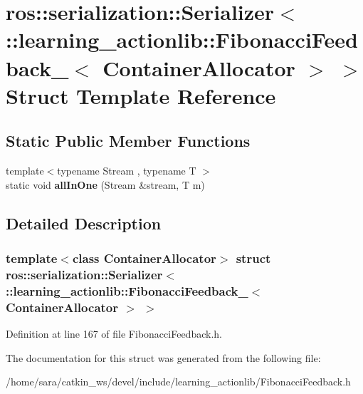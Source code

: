 \hypertarget{structros_1_1serialization_1_1Serializer_3_01_1_1learning__actionlib_1_1FibonacciFeedback___3_01ContainerAllocator_01_4_01_4}{}\section{ros\+:\+:serialization\+:\+:Serializer$<$ \+:\+:learning\+\_\+actionlib\+:\+:Fibonacci\+Feedback\+\_\+$<$ Container\+Allocator $>$ $>$ Struct Template Reference}
\label{structros_1_1serialization_1_1Serializer_3_01_1_1learning__actionlib_1_1FibonacciFeedback___3_01ContainerAllocator_01_4_01_4}
\subsection*{Static Public Member Functions}
\begin{DoxyCompactItemize}
\item 
\mbox{\label{structros_1_1serialization_1_1Serializer_3_01_1_1learning__actionlib_1_1FibonacciFeedback___3_01ContainerAllocator_01_4_01_4_a725d889a5c27625b116a7d0308266ded}} 
{\footnotesize template$<$typename Stream , typename T $>$ }\\static void {\bfseries all\+In\+One} (Stream \&stream, T m)
\end{DoxyCompactItemize}


\subsection{Detailed Description}
\subsubsection*{template$<$class Container\+Allocator$>$\newline
struct ros\+::serialization\+::\+Serializer$<$ \+::learning\+\_\+actionlib\+::\+Fibonacci\+Feedback\+\_\+$<$ Container\+Allocator $>$ $>$}



Definition at line 167 of file Fibonacci\+Feedback.\+h.



The documentation for this struct was generated from the following file\+:\begin{DoxyCompactItemize}
\item 
/home/sara/catkin\+\_\+ws/devel/include/learning\+\_\+actionlib/Fibonacci\+Feedback.\+h\end{DoxyCompactItemize}

